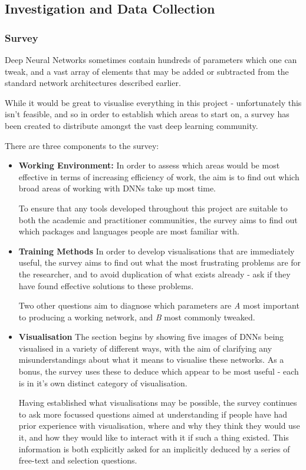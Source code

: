 \documentclass[a4paper,11pt,titlepage]{article}
\begin{document}
	\subsection{Investigation and Data Collection}
		\subsubsection{Survey}
		Deep Neural Networks sometimes contain hundreds of parameters which one can tweak, and a vast array of elements that may be added or subtracted from the standard network architectures described earlier.
		\par 
		While it would be great to visualise everything in this project - unfortunately this isn't feasible, and so in order to establish which areas to start on, a survey has been created to distribute amongst the vast deep learning community. 
		\par 
		There are three components to the survey:
		\begin{itemize}
			\item \textbf{Working Environment:}
		In order to assess which areas would be most effective in terms of increasing efficiency of work, the aim is to find out which broad areas of working with DNNs take up most time.
		\par 
		To ensure that any tools developed throughout this project are suitable to both the academic and practitioner communities, the survey aims to find out which packages and languages people are most familiar with.
			\item \textbf{Training Methods}
		In order to develop visualisations that are immediately useful, the survey aims to find out what the most frustrating problems are for the researcher, and to avoid duplication of what exists already - ask if they have found effective solutions to these problems.
		\par
		Two other questions aim to diagnose which parameters are \textit{A} most important to producing a working network, and \textit{B} most commonly tweaked.
			\item \textbf{Visualisation}
		The section begins by showing five images of DNNs being visualised in a variety of different ways, with the aim of clarifying any misunderstandings about what it means to visualise these networks. As a bonus, the survey uses these to deduce which appear to be most useful - each is in it's own distinct category of visualisation.
		\par 
		Having established what visualisations may be possible, the survey continues to ask more focussed questions aimed at understanding if people have had prior experience with visualisation, where and why they think they would use it, and how they would like to interact with it if such a thing existed. This information is both explicitly asked for an implicitly deduced by a series of free-text and selection questions.
		
		\end{itemize}
		\par
		
\end{document}
